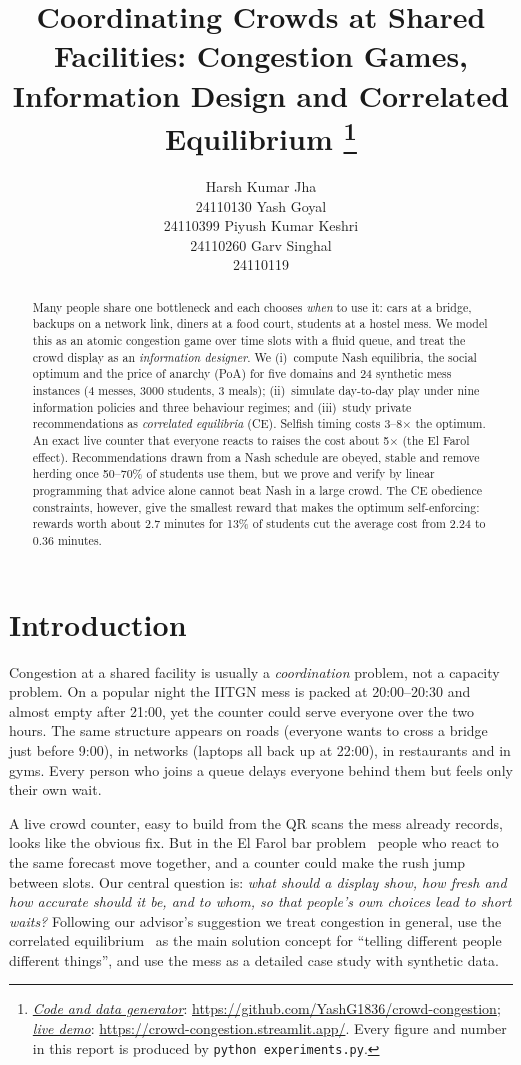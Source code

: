 \documentclass{article}
\title{Coordinating Crowds at Shared Facilities: Congestion Games, Information Design and Correlated Equilibrium
\thanks{\textit{\underline{Code and data generator}}: \url{https://github.com/YashG1836/crowd-congestion};
\textit{\underline{live demo}}: \url{https://crowd-congestion.streamlit.app/}.
Every figure and number in this report is produced by \texttt{python experiments.py}.}}
\author{
  Harsh Kumar Jha \\ 24110130
  \And
  Yash Goyal \\ 24110399
  \And
  Piyush Kumar Keshri \\ 24110260
  \And
  Garv Singhal \\ 24110119
}
\date{}
\begin{document}
\raggedbottom
\maketitle

\begin{abstract}
\noindent Many people share one bottleneck and each chooses \emph{when} to use it: cars at a bridge, backups on a network
link, diners at a food court, students at a hostel mess. We model this as an atomic congestion game over time slots
with a fluid queue, and treat the crowd display as an \emph{information designer}. We (i)~compute Nash equilibria,
the social optimum and the price of anarchy (PoA) for five domains and 24 synthetic mess instances (4 messes, 3000
students, 3 meals); (ii)~simulate day-to-day play under nine information policies and three behaviour regimes; and
(iii)~study private recommendations as \emph{correlated equilibria} (CE). Selfish timing costs 3--8$\times$ the
optimum. An exact live counter that everyone reacts to raises the cost about 5$\times$ (the El Farol effect).
Recommendations drawn from a Nash schedule are obeyed, stable and remove herding once 50--70\% of students use
them, but we prove and verify by linear programming that advice alone cannot beat Nash in a large crowd. The CE
obedience constraints, however, give the smallest reward that makes the optimum self-enforcing: rewards worth
about 2.7 minutes for 13\% of students cut the average cost from 2.24 to 0.36 minutes.
\end{abstract}


\section{Introduction}
Congestion at a shared facility is usually a \emph{coordination} problem, not a capacity problem. On a popular
night the IITGN mess is packed at 20:00--20:30 and almost empty after 21:00, yet the counter could serve everyone
over the two hours. The same structure appears on roads (everyone wants to cross a bridge just before 9:00), in
networks (laptops all back up at 22:00), in restaurants and in gyms. Every person who joins a queue delays everyone
behind them but feels only their own wait.

A live crowd counter, easy to build from the QR scans the mess already records, looks like the obvious fix. But in
the El Farol bar problem~\cite{arthur} people who react to the same forecast move together, and a counter could
make the rush jump between slots. Our central question is: \emph{what should a display show, how fresh and how
accurate should it be, and to whom, so that people's own choices lead to short waits?} Following our advisor's
suggestion we treat congestion in general, use the correlated equilibrium~\cite{aumann} as the main solution
concept for ``telling different people different things'', and use the mess as a detailed case study with
synthetic data.
\end{document}
